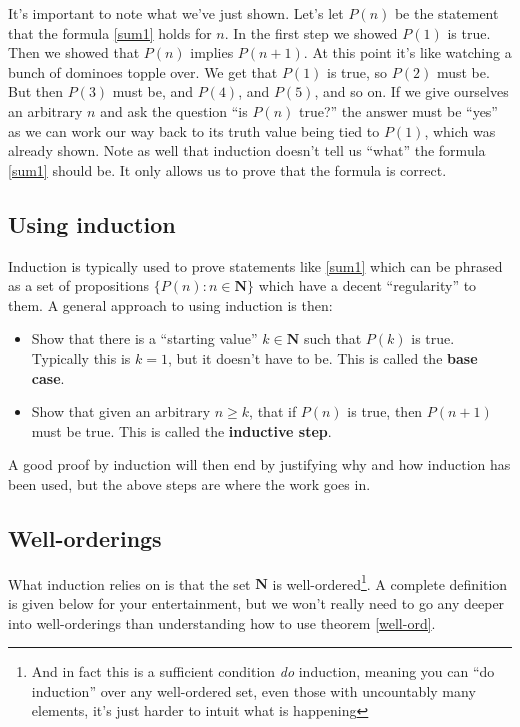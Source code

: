 \documentclass[12pt]{article}
\numberwithin{equation}{subsection}
\theoremstyle{note}
\begin{document}
It's important to note what we've just shown. Let's let $P(n)$ be the statement that the formula \eqref{sum1} holds for $n$. In the first step we showed $P(1)$ is true. Then we showed that $P(n)$ implies $P(n+1)$. At this point it's like watching a bunch of dominoes topple over. We get that $P(1)$ is true, so $P(2)$ must be. But then $P(3)$ must be, and $P(4)$, and $P(5)$,  and so on. If we give ourselves an arbitrary $n$ and ask the question ``is $P(n)$ true?'' the answer must be ``yes'' as we can work our way back to its truth value being tied to $P(1)$, which was already shown. Note as well that induction doesn't tell us ``what'' the formula \eqref{sum1} should be. It only allows us to prove that the formula is correct. 


\subsection{Using induction}

Induction is typically used to prove statements like \eqref{sum1} which can be phrased as a set of propositions $\{P(n) : n\in \mathbf{N}\}$ which have a decent ``regularity'' to them. A general approach to using induction is then:
\begin{itemize}
	\item Show that there is a ``starting value'' $k\in\mathbf{N}$ such that $P(k)$ is true. Typically this is $k=1$, but it doesn't have to be. This is called the \textbf{base case}.
	\item Show that given an arbitrary $n\geq k$, that if $P(n)$ is true, then $P(n+1)$ must be true. This is called the \textbf{inductive step}.
\end{itemize}
A good proof by induction will then end by justifying why and how induction has been used, but the above steps are where the work goes in. 

\subsection{Well-orderings}
What induction relies on is that the set $\mathbf{N}$ is well-ordered\footnote{And in fact this is a sufficient condition \textit{do} induction, meaning you can ``do induction'' over any well-ordered set, even those with uncountably many elements, it's just harder to intuit what is happening}. A complete definition is given below for your entertainment, but we won't really need to go any deeper into well-orderings than understanding how to use theorem \ref{well-ord}. 
\end{document}
